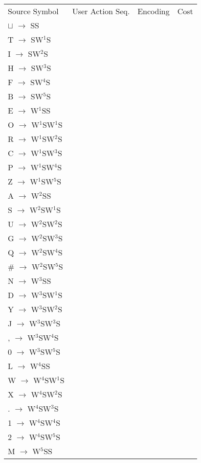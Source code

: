 \documentclass[12pt]{article}
\begin{document}
\begin{tabular}{l l l l}
Source Symbol	&	User Action Seq.	&	Encoding	&	Cost\\
$\sqcup$ $\rightarrow$ SS	&	\\
T $\rightarrow$ SW{$^{1}$}S	&	\\
I $\rightarrow$ SW{$^{2}$}S	&	\\
H $\rightarrow$ SW{$^{3}$}S	&	\\
F $\rightarrow$ SW{$^{4}$}S	&	\\
B $\rightarrow$ SW{$^{5}$}S	&	\\
E $\rightarrow$ W{$^{1}$}SS	&	\\
O $\rightarrow$ W{$^{1}$}SW{$^{1}$}S	&	\\
R $\rightarrow$ W{$^{1}$}SW{$^{2}$}S	&	\\
C $\rightarrow$ W{$^{1}$}SW{$^{3}$}S	&	\\
P $\rightarrow$ W{$^{1}$}SW{$^{4}$}S	&	\\
Z $\rightarrow$ W{$^{1}$}SW{$^{5}$}S	&	\\
A $\rightarrow$ W{$^{2}$}SS	&	\\
S $\rightarrow$ W{$^{2}$}SW{$^{1}$}S	&	\\
U $\rightarrow$ W{$^{2}$}SW{$^{2}$}S	&	\\
G $\rightarrow$ W{$^{2}$}SW{$^{3}$}S	&	\\
Q $\rightarrow$ W{$^{2}$}SW{$^{4}$}S	&	\\
\# $\rightarrow$ W{$^{2}$}SW{$^{5}$}S	&	\\
N $\rightarrow$ W{$^{3}$}SS	&	\\
D $\rightarrow$ W{$^{3}$}SW{$^{1}$}S	&	\\
Y $\rightarrow$ W{$^{3}$}SW{$^{2}$}S	&	\\
J $\rightarrow$ W{$^{3}$}SW{$^{3}$}S	&	\\
, $\rightarrow$ W{$^{3}$}SW{$^{4}$}S	&	\\
0 $\rightarrow$ W{$^{3}$}SW{$^{5}$}S	&	\\
L $\rightarrow$ W{$^{4}$}SS	&	\\
W $\rightarrow$ W{$^{4}$}SW{$^{1}$}S	&	\\
X $\rightarrow$ W{$^{4}$}SW{$^{2}$}S	&	\\
. $\rightarrow$ W{$^{4}$}SW{$^{3}$}S	&	\\
1 $\rightarrow$ W{$^{4}$}SW{$^{4}$}S	&	\\
2 $\rightarrow$ W{$^{4}$}SW{$^{5}$}S	&	\\
M $\rightarrow$ W{$^{5}$}SS	&	\\

\end{tabular}
\end{document}
